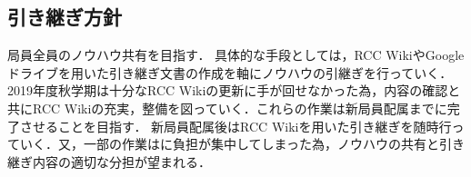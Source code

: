 \subsection*{引き継ぎ方針}

局員全員のノウハウ共有を目指す．
具体的な手段としては，RCC WikiやGoogleドライブを用いた引き継ぎ文書の作成を軸にノウハウの引継ぎを行っていく．2019年度秋学期は十分なRCC Wikiの更新に手が回せなかった為，内容の確認と共にRCC Wikiの充実，整備を図っていく．これらの作業は新局員配属までに完了させることを目指す．
新局員配属後はRCC Wikiを用いた引き継ぎを随時行っていく．又，一部の作業は\thirdGrade{}に負担が集中してしまった為，ノウハウの共有と引き継ぎ内容の適切な分担が望まれる．
